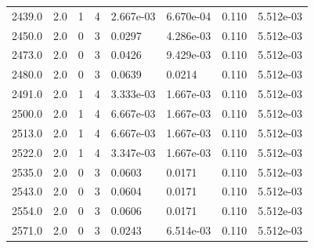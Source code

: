 \documentclass[preview]{standalone}
\begin{document}
{{{{{{{\begin{tabular}{L{1.2cm}C{1.2cm} C{0.3cm}C{0.5cm} C{1.4cm}C{1.4cm} C{1.4cm}C{1.4cm}}
  2439.0  &   2.0  & 1     &  4 &  2.667e-03  & 6.670e-04  & 0.110 &  5.512e-03   \\ 
  2450.0  &   2.0  & 0     &  3 &  0.0297  & 4.286e-03  & 0.110 &  5.512e-03   \\ 
  2473.0  &   2.0  & 0     &  3 &  0.0426  & 9.429e-03  & 0.110 &  5.512e-03   \\ 
  2480.0  &   2.0  & 0     &  3 &  0.0639  & 0.0214  & 0.110 &  5.512e-03   \\ 
  2491.0  &   2.0  & 1     &  4 &  3.333e-03  & 1.667e-03  & 0.110 &  5.512e-03   \\ 
  2500.0  &   2.0  & 1     &  4 &  6.667e-03  & 1.667e-03  & 0.110 &  5.512e-03   \\ 
  2513.0  &   2.0  & 1     &  4 &  6.667e-03  & 1.667e-03  & 0.110 &  5.512e-03   \\ 
  2522.0  &   2.0  & 1     &  4 &  3.347e-03  & 1.667e-03  & 0.110 &  5.512e-03   \\ 
  2535.0  &   2.0  & 0     &  3 &  0.0603  & 0.0171  & 0.110 &  5.512e-03   \\ 
  2543.0  &   2.0  & 0     &  3 &  0.0604  & 0.0171  & 0.110 &  5.512e-03   \\ 
  2554.0  &   2.0  & 0     &  3 &  0.0606  & 0.0171  & 0.110 &  5.512e-03   \\ 
  2571.0  &   2.0  & 0     &  3 &  0.0243  & 6.514e-03  & 0.110 &  5.512e-03   \\ 
\hline 
\end{tabular} 

}}}}}}}
\end{document}
